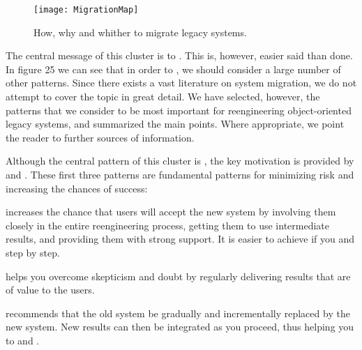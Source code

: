 \documentclass[a4paper,10pt,twoside]{book}
\begin{document}
\begin{figure}
\begin{center}
\texttt{[image: MigrationMap]}
\caption{How, why and whither to migrate legacy systems.}
\end{center}
\end{figure}

The central message of this cluster is to . This is, however, easier said than done. In figure 25 we can see that in order to , we should consider a large number of other patterns. Since there exists a vast literature on system migration, we do not attempt to cover the topic in great detail. We have selected, however, the patterns that we consider to be most important for reengineering object-oriented legacy systems, and summarized the main points. Where appropriate, we point the reader to further sources of information.

Although the central pattern of this cluster is , the key motivation is provided by  and . These first three patterns are fundamental patterns for minimizing risk and increasing the chances of success:

\begin{bulletlist}
\item {} increases the chance that users will accept the new system by involving them closely in the entire reengineering process, getting them to use intermediate results, and providing them with strong support. It is easier to achieve if you  and  step by step.

\item {} helps you overcome skepticism and doubt by regularly delivering results that are of value to the users. 

\item {} recommends that the old system be gradually and incrementally replaced by the new system. New results can then be integrated as you proceed, thus helping you to  and .
\end{bulletlist}
\end{document}
